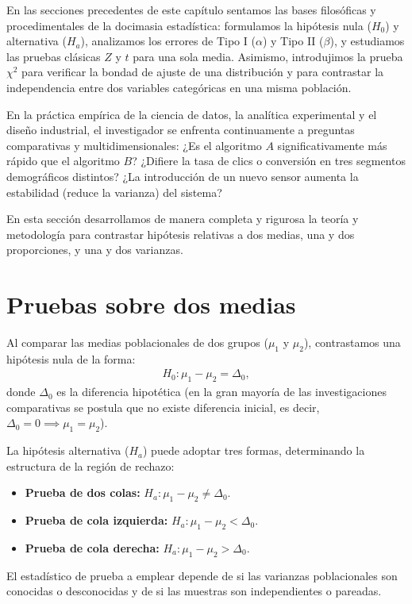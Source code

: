 En las secciones precedentes de este capítulo sentamos las bases filosóficas y procedimentales de la docimasia estadística: formulamos la hipótesis nula ($H_0$) y alternativa ($H_a$), analizamos los errores de Tipo I ($\alpha$) y Tipo II ($\beta$), y estudiamos las pruebas clásicas $Z$ y $t$ para una sola media. Asimismo, introdujimos la prueba $\chi^2$ para verificar la bondad de ajuste de una distribución y para contrastar la independencia entre dos variables categóricas en una misma población.

En la práctica empírica de la ciencia de datos, la analítica experimental y el diseño industrial, el investigador se enfrenta continuamente a preguntas comparativas y multidimensionales: ¿Es el algoritmo $A$ significativamente más rápido que el algoritmo $B$? ¿Difiere la tasa de clics o conversión en tres segmentos demográficos distintos? ¿La introducción de un nuevo sensor aumenta la estabilidad (reduce la varianza) del sistema?

En esta sección desarrollamos de manera completa y rigurosa la teoría y metodología para contrastar hipótesis relativas a dos medias, una y dos proporciones, y una y dos varianzas.

\section{Pruebas sobre dos medias}

Al comparar las medias poblacionales de dos grupos ($\mu_1$ y $\mu_2$), contrastamos una hipótesis nula de la forma:
\begin{align}
	H_0: \mu_1 - \mu_2 = \Delta_0,
\end{align}
donde $\Delta_0$ es la diferencia hipotética (en la gran mayoría de las investigaciones comparativas se postula que no existe diferencia inicial, es decir, $\Delta_0 = 0 \implies \mu_1 = \mu_2$).

La hipótesis alternativa ($H_a$) puede adoptar tres formas, determinando la estructura de la región de rechazo:
\begin{itemize}
	\item \textbf{Prueba de dos colas:} $H_a: \mu_1 - \mu_2 \neq \Delta_0$.
	\item \textbf{Prueba de cola izquierda:} $H_a: \mu_1 - \mu_2 < \Delta_0$.
	\item \textbf{Prueba de cola derecha:} $H_a: \mu_1 - \mu_2 > \Delta_0$.
\end{itemize}

El estadístico de prueba a emplear depende de si las varianzas poblacionales son conocidas o desconocidas y de si las muestras son independientes o pareadas.

